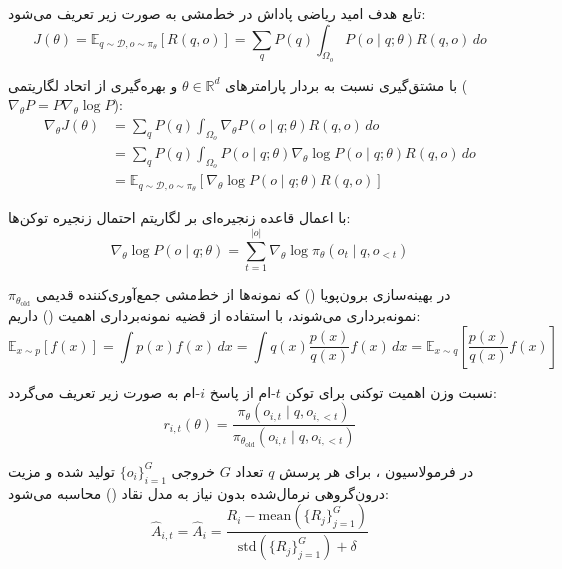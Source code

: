 تابع هدف امید ریاضی پاداش در خط‌مشی به صورت زیر تعریف می‌شود:
\begin{equation}
	J(\theta) = \mathbb{E}_{q \sim \mathcal{D}, o \sim \pi_\theta} [R(q, o)] = \sum_{q} P(q) \int_{\Omega_o} P(o \mid q; \theta) R(q, o) \, do
\end{equation}

با مشتق‌گیری نسبت به بردار پارامترهای $\theta \in \mathbb{R}^d$ و بهره‌گیری از اتحاد لگاریتمی ($\nabla_\theta P = P \nabla_\theta \log P$):
\begin{align}
	\nabla_\theta J(\theta) &= \sum_{q} P(q) \int_{\Omega_o} \nabla_\theta P(o \mid q; \theta) R(q, o) \, do \nonumber \\
	&= \sum_{q} P(q) \int_{\Omega_o} P(o \mid q; \theta) \nabla_\theta \log P(o \mid q; \theta) R(q, o) \, do \nonumber \\
	&= \mathbb{E}_{q \sim \mathcal{D}, o \sim \pi_\theta} \left[ \nabla_\theta \log P(o \mid q; \theta) R(q, o) \right]
\end{align}

با اعمال قاعده زنجیره‌ای بر لگاریتم احتمال زنجیره توکن‌ها:
\begin{equation}
	\nabla_\theta \log P(o \mid q; \theta) = \sum_{t=1}^{|o|} \nabla_\theta \log \pi_\theta(o_t \mid q, o_{<t})
\end{equation}

در بهینه‌سازی برون‌پویا () که نمونه‌ها از خط‌مشی جمع‌آوری‌کننده قدیمی $\pi_{\theta_{\text{old}}}$ نمونه‌برداری می‌شوند، با استفاده از قضیه نمونه‌برداری اهمیت () داریم:
\begin{equation}
	\mathbb{E}_{x \sim p}[f(x)] = \int p(x) f(x) \, dx = \int q(x) \frac{p(x)}{q(x)} f(x) \, dx = \mathbb{E}_{x \sim q} \left[ \frac{p(x)}{q(x)} f(x) \right]
\end{equation}

نسبت وزن اهمیت توکنی برای توکن $t$-ام از پاسخ $i$-ام به صورت زیر تعریف می‌گردد:
\begin{equation}
	r_{i,t}(\theta) = \frac{\pi_\theta(o_{i,t} \mid q, o_{i,<t})}{\pi_{\theta_{\text{old}}}(o_{i,t} \mid q, o_{i,<t})}
\end{equation}

در فرمولاسیون  \cite{shao2024deepseekmath}، برای هر پرسش $q$ تعداد $G$ خروجی $\{o_i\}_{i=1}^G$ تولید شده و مزیت درون‌گروهی نرمال‌شده بدون نیاز به مدل نقاد () محاسبه می‌شود:
\begin{equation}
	\hat{A}_{i,t} = \hat{A}_i = \frac{R_i - \text{mean}(\{R_j\}_{j=1}^G)}{\text{std}(\{R_j\}_{j=1}^G) + \delta}
\end{equation}

